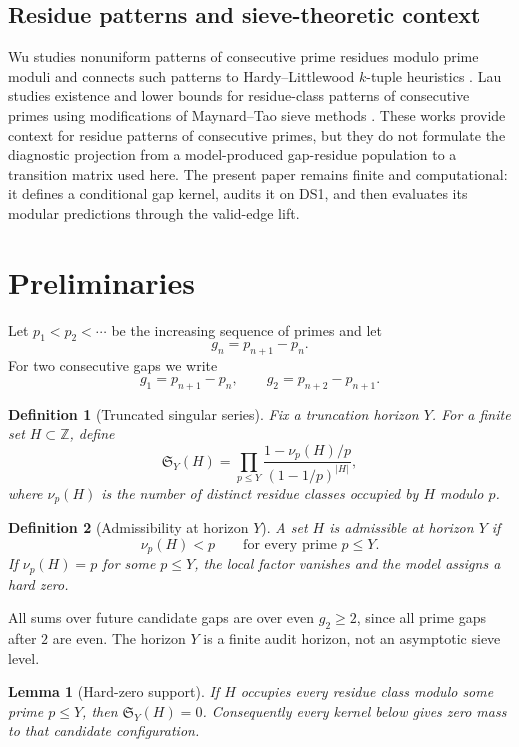 \documentclass[10pt]{article}
\newtheorem{definition}{Definition}
\newtheorem{lemma}{Lemma}
\newcommand{\SY}{\mathfrak{S}_Y}
\begin{document}
\subsection{Residue patterns and sieve-theoretic context}
Wu studies nonuniform patterns of consecutive prime residues modulo prime moduli and connects such patterns to Hardy--Littlewood $k$-tuple heuristics \cite{wu2019}.  Lau studies existence and lower bounds for residue-class patterns of consecutive primes using modifications of Maynard--Tao sieve methods \cite{lau2024}.  These works provide context for residue patterns of consecutive primes, but they do not formulate the diagnostic projection from a model-produced gap-residue population to a transition matrix used here.  The present paper remains finite and computational: it defines a conditional gap kernel, audits it on DS1, and then evaluates its modular predictions through the valid-edge lift.

\section{Preliminaries}
Let $p_1<p_2<\cdots$ be the increasing sequence of primes and let
\[
g_n=p_{n+1}-p_n.
\]
For two consecutive gaps we write
\[
g_1=p_{n+1}-p_n,\qquad g_2=p_{n+2}-p_{n+1}.
\]

\begin{definition}[Truncated singular series]
Fix a truncation horizon $Y$.  For a finite set $H\subset\mathbb Z$, define
\[
\SY(H)=\prod_{p\le Y}\frac{1-\nu_p(H)/p}{(1-1/p)^{|H|}},
\]
where $\nu_p(H)$ is the number of distinct residue classes occupied by $H$ modulo $p$.
\end{definition}

\begin{definition}[Admissibility at horizon $Y$]
A set $H$ is admissible at horizon $Y$ if
\[
\nu_p(H)<p\qquad\text{for every prime }p\le Y.
\]
If $\nu_p(H)=p$ for some $p\le Y$, the local factor vanishes and the model assigns a hard zero.
\end{definition}

All sums over future candidate gaps are over even $g_2\ge2$, since all prime gaps after $2$ are even.  The horizon $Y$ is a finite audit horizon, not an asymptotic sieve level.

\begin{lemma}[Hard-zero support]
If $H$ occupies every residue class modulo some prime $p\le Y$, then $\SY(H)=0$.  Consequently every kernel below gives zero mass to that candidate configuration.
\end{lemma}
\end{document}
